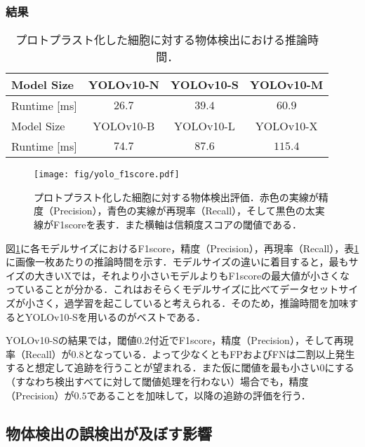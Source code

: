     \subsubsection{結果}

    \begin{table}[t]
        \centering
        \caption[プロトプラスト化した細胞に対する物体検出における推論時間]{プロトプラスト化した細胞に対する物体検出における推論時間．}
        \label{tab:yolo_runtime}
        \begin{tabular}{l|ccc}
            \hline Model Size & YOLOv10-N & YOLOv10-S & YOLOv10-M  
            \\\hline \hline Runtime [ms] & $26.7$ & $39.4$ & $60.9$ 
            \\ \hline Model Size & YOLOv10-B & YOLOv10-L & YOLOv10-X 
            \\ \hline \hline Runtime [ms] & $74.7$ & $87.6$ & $115.4$ 
        \end{tabular}
    \end{table}

    \begin{figure}[t]
        \centering
        \texttt{[image: fig/yolo\_f1score.pdf]}
        \caption[プロトプラスト化した細胞に対する物体検出評価]{プロトプラスト化した細胞に対する物体検出評価．赤色の実線が精度（Precision），青色の実線が再現率（Recall），そして黒色の太実線がF1scoreを表す．また横軸は信頼度スコアの閾値である．}
        \label{fig:yolo_f1score}
    \end{figure}

    図\ref{fig:yolo_f1score}に各モデルサイズにおけるF1score，精度（Precision），再現率（Recall），表\ref{tab:yolo_runtime}に画像一枚あたりの推論時間を示す．モデルサイズの違いに着目すると，最もサイズの大きいXでは，それより小さいモデルよりもF1scoreの最大値が小さくなっていることが分かる．これはおそらくモデルサイズに比べてデータセットサイズが小さく，過学習を起こしていると考えられる．そのため，推論時間を加味するとYOLOv10-Sを用いるのがベストである．

    YOLOv10-Sの結果では，閾値$0.2$付近でF1score，精度（Precision），そして再現率（Recall）が$0.8$となっている．よって少なくともFPおよびFNは二割以上発生すると想定して追跡を行うことが望まれる．また仮に閾値を最も小さい$0$にする（すなわち検出すべてに対して閾値処理を行わない）場合でも，精度（Precision）が$0.5$であることを加味して，以降の追跡の評価を行う．

    \subsection{物体検出の誤検出が及ぼす影響}
    \label{subsec:FPeffect}


